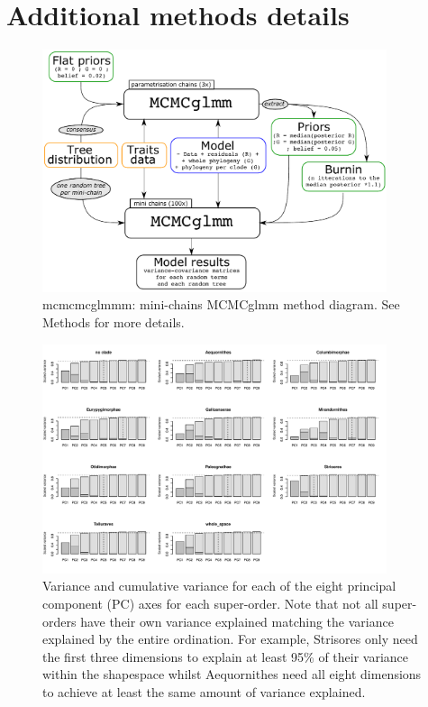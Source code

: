 \documentclass[12pt,a4paper]{article}
\begin{document}

%
%

\section{Additional methods details}

\begin{figure}[H]
\centering
   \includegraphics[width=0.9\textwidth]{Figures/mini-chains_diagram.pdf}
\caption{mcmcmcglmmm: mini-chains MCMCglmm method diagram. See Methods for more details.}
\label{Fig:mcmcmcglmm}
\end{figure}

\newpage


\begin{figure}[H]
\centering
   \includegraphics[width=0.9\textwidth]{Figures/axis_selection.pdf}
\caption{Variance and cumulative variance for each of the eight principal component (PC) axes for each super-order. Note that not all super-orders have their own variance explained matching the variance explained by the entire ordination. For example, Strisores only need the first three dimensions to explain at least 95\% of their variance within the shapespace whilst Aequornithes need all eight dimensions to achieve at least the same amount of variance explained.}
\label{Fig:axes_variance}
\end{figure}
\end{document}
